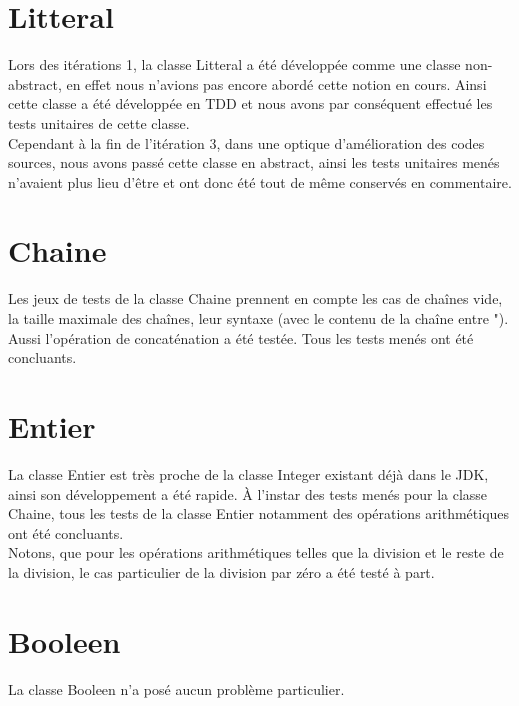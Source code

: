 
\section{Litteral}

Lors des itérations 1, la classe Litteral a été développée comme une classe
non-abstract, en effet nous n'avions pas encore abordé cette notion en cours.
Ainsi cette classe a été développée en TDD et nous avons par conséquent
effectué les tests unitaires de cette classe.
\\ Cependant à la fin de l'itération 3, dans une optique d'amélioration des
codes sources, nous avons passé cette classe en abstract, ainsi les tests
unitaires menés n'avaient plus lieu d'être et ont donc été tout de même
conservés en commentaire.

\section{Chaine}

Les jeux de tests de la classe Chaine prennent en compte les cas de chaînes
vide, la taille maximale des chaînes, leur syntaxe (avec le contenu de la
chaîne entre "). Aussi l'opération de concaténation a été testée.
Tous les tests menés ont été concluants.

\section{Entier}

La classe Entier est très proche de la classe Integer existant déjà dans le
JDK, ainsi son développement a été rapide.
À l'instar des tests menés pour la classe Chaine, tous les tests de la classe
Entier notamment des opérations arithmétiques ont été concluants.
\\ Notons, que pour les opérations arithmétiques telles que la division et le
reste de la division, le cas particulier de la division par zéro a été testé
à part.

\section{Booleen}

La classe Booleen n'a posé aucun problème particulier.
